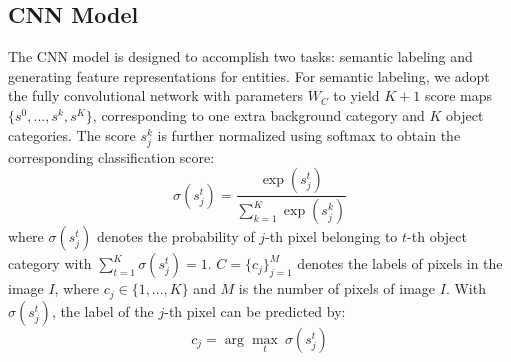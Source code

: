 \documentclass[10pt,twocolumn,letterpaper]{article}
\begin{document}
\subsection{CNN Model}
\label{sub:cnn_model}


The CNN model is designed to accomplish two tasks: semantic labeling and generating feature representations for entities. For semantic labeling, we adopt the fully convolutional network with parameters $W_C$ to yield $K+1$ score maps $\{{s}^0, ..., {s}^k, {s}^K\}$, corresponding to one extra background category and $K$ object categories. The score $s_j^k$ is further normalized using softmax to obtain the corresponding classification score:
\begin{equation}\label{eq_softmax}
\sigma(s_j^t) = \frac{\exp(s_j^t)} {\sum_{k=1}^K \exp(s_j^k)}
\end{equation}
where $\sigma(s_j^t)$ denotes the probability of $j$-th pixel belonging to $t$-th object category with $\sum_{t=1}^K \sigma(s_j^t)=1$. $C=\{c_j\}_{j=1}^M$ denotes the labels of pixels in the image $I$, where $c_j\in \{1,...,K\}$ and $M$ is the number of pixels of image $I$. With $\sigma(s_j^t)$, the label of the $j$-th pixel can be predicted by:
\begin{equation}\label{eq_prediction}
c_j = \arg\max_t \: \sigma(s_j^t)
\end{equation}
\end{document}
